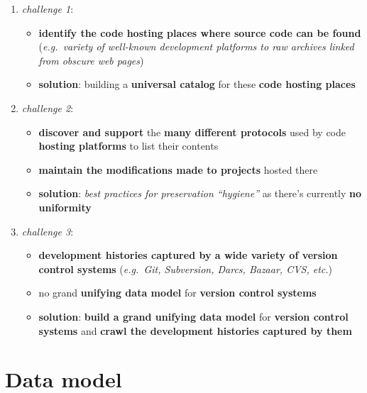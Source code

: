 \documentclass[11pt]{article}
\providecommand{\tightlist}{%
      \setlength{\itemsep}{0pt}\setlength{\parskip}{0pt}}
\begin{document}
\begin{enumerate}
\def\labelenumi{\arabic{enumi}.}
\tightlist
\item
  \emph{challenge 1}:

  \begin{itemize}
  \tightlist
  \item
    \textbf{identify the code hosting places where source code can be
    found} (\emph{e.g.~variety of well-known development platforms to
    raw archives linked from obscure web pages})
  \item
    \textbf{solution}: building a \textbf{universal catalog} for these
    \textbf{code hosting places}
  \end{itemize}
\item
  \emph{challenge 2}:

  \begin{itemize}
  \tightlist
  \item
    \textbf{discover and support} the \textbf{many different protocols}
    used by code \textbf{hosting platforms} to list their contents
  \item
    \textbf{maintain the modifications made to projects} hosted there
  \item
    \textbf{solution}: \emph{best practices for preservation
    ``hygiene''} as there's currently \textbf{no uniformity}
  \end{itemize}
\item
  \emph{challenge 3}:

  \begin{itemize}
  \tightlist
  \item
    \textbf{development histories captured by a wide variety of version
    control systems} (\emph{e.g.~Git, Subversion, Darcs, Bazaar, CVS,
    etc.})
  \item
    no grand \textbf{unifying data model} for \textbf{version control
    systems}
  \item
    \textbf{solution}: \textbf{build a grand unifying data model} for
    \textbf{version control systems} and \textbf{crawl the development
    histories captured by them}
  \end{itemize}
\end{enumerate}

\hypertarget{data-model}{%
\section{Data model}\label{data-model}}
\end{document}
